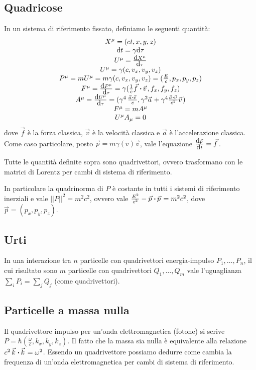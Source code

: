 \documentclass[10pt,a4paper]{article}
\newcommand{\de}{{\ensuremath{ \mbox{d}}}}
\newcommand{\norm}[1]{{\ensuremath{||{#1}||}}}
\begin{document}
\begin{multicols}{2}
  \subsection*{Quadricose}
  In un sistema di riferimento fissato, definiamo le seguenti quantità:
  \begin{displaymath}
    \begin{array}{c}
      X^\mu = (ct, x, y, z) \\
      \de t = \gamma \de \tau \\
      U^\mu = \ded{X^\mu}{\tau} \\
      U^\mu = \gamma (c, v_x, v_y, v_z) \\
      P^\mu = m U^\mu = m \gamma (c, v_x, v_y, v_z) = (\frac{E}{c}, p_x, p_y, p_z) \\
      F^\mu = \ded{P^\mu}{\tau} = \gamma (\frac{1}{c} \vec{f} \dotp \vec{v}, f_x, f_y, f_z) \\
      A^\mu = \ded{U^\mu}{\tau} = (\gamma^4 \, \frac{\vec a \dotp \vec v}{c}, \gamma^2 \vec a + \gamma^4 \frac{\vec a \dotp \vec v}{c^2} \vec v) \\
      F^\mu = m A^\mu \\
      U^\mu A_\mu = 0 \\
    \end{array}
  \end{displaymath}
  dove $\vec{f}$ è la forza classica, $\vec{v}$ è la velocità classica e $\vec a$ è l'accelerazione classica. Come caso particolare, posto $\vec p = m \gamma(v) \vec v$, vale l'equazione $\ded{\vec p}{t} = \vec f$. 

  Tutte le quantità definite sopra sono quadrivettori, ovvero trasformano con le matrici di Lorentz per cambi di sistema di riferimento.

  In particolare la quadrinorma di $P$ è costante in tutti i sistemi di riferimento inerziali e vale $\norm{P}^2 = m^2 c^2$, ovvero vale $\frac{E^2}{c^2} - {\vec p} \dotp {\vec p} = m^2 c^2$, dove $\vec p = (p_x, p_y, p_z)$.

  \subsection*{Urti}
  In una interazione tra $n$ particelle con quadrivettori energia-impulso $P_1, \ldots, P_n$, il cui risultato sono $m$ particelle con quadrivettori $Q_1, \ldots, Q_m$ vale l'uguaglianza $\sum_i P_i = \sum_j Q_j$ (come quadrivettori).

  \subsection*{Particelle a massa nulla}
  Il quadrivettore impulso per un'onda elettromagnetica (fotone) si scrive $P = \hbar (\frac{\omega}{c}, k_x, k_y, k_z)$.
  Il fatto che la massa sia nulla è equivalente alla relazione $c^2 \, \vec{k} \dotp \vec{k} = \omega^2$.
  Essendo un quadrivettore possiamo dedurre come cambia la frequenza di un'onda elettromagnetica per cambi di sistema di riferimento.


\end{multicols}
\end{document}
